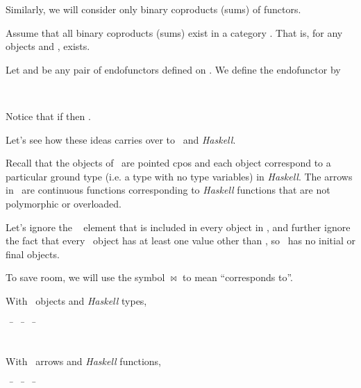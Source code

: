 Similarly, we will consider only binary coproducts (sums) of functors.

\newslide

Assume that all binary coproducts (sums) exist in a category \CC.  That is,
for any objects  and ,  exists.

\vs

Let  and  be any pair of endofunctors defined on \CC.
We define the endofunctor  by

\begin{codenott}
\\
\end{codenott}

\vs

Notice that if  then
.

\newslide

Let's see how these ideas carries over to \Ha \, and \textit{Haskell}.

Recall that the objects of \Ha \, are pointed cpos and each
object correspond to
a particular ground type (i.e. a type with no
type variables) in \textit{Haskell}.  The
arrows in \Ha \, are continuous functions corresponding to
\textit{Haskell}
functions that are not polymorphic or overloaded.

Let's ignore the \bottom ~ element that is included in every object
in \Ha, and further ignore the fact that every \Ha \, object has at least one
value other than \bottom, so \Ha \, has no initial or final objects.

\newslide

To save room, we will use the symbol $\bowtie$ to mean ``corresponds to''.

With \Ha \, objects and \textit{Haskell} types,\\
\begin{codenott}
 ~ \= 
\bla{$\bowtie$} ~ \=  ~
\= \kill
{} \> \bla{$\bowtie$} \> \\
 \> \bla{$\bowtie$} \> \\
\end{codenott}

With \Ha \, arrows and \textit{Haskell} functions,
\begin{codenott}
 ~ \= 
\bla{$\bowtie$} ~ \=  ~
\= \kill
{} \>
\bla{$\bowtie$} \>  \> \\
\tm{[f,g]} \> \bla{$\bowtie$} \>  \>
\\
\> \> \> 
\end{codenott}

